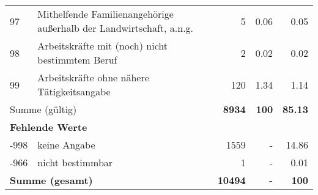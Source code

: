 \begin{longtable}{lXrrr}
        97 & \multicolumn{1}{X}{Mithelfende Familienangehörige außerhalb der Landwirtschaft, a.n.g.} & %
          \num{5} &
          \num[round-mode=places,round-precision=2]{0.06} &
          \num[round-mode=places,round-precision=2]{0.05} \\

        98 & \multicolumn{1}{X}{Arbeitskräfte mit (noch) nicht bestimmtem Beruf} & %
          \num{2} &
          \num[round-mode=places,round-precision=2]{0.02} &
          \num[round-mode=places,round-precision=2]{0.02} \\

        99 & \multicolumn{1}{X}{Arbeitskräfte ohne nähere Tätigkeitsangabe} & %
          \num{120} &
          \num[round-mode=places,round-precision=2]{1.34} &
          \num[round-mode=places,round-precision=2]{1.14} \\

     \midrule
     \multicolumn{2}{l}{Summe (gültig)} &
       \textbf{\num{8934}} &
     \textbf{\num{100}} &
       \textbf{\num[round-mode=places,round-precision=2]{85.13}} \\
     \multicolumn{5}{l}{\textbf{Fehlende Werte}}\\
       -998 &
       keine Angabe &
         \num{1559} &
        - &
         \num[round-mode=places,round-precision=2]{14.86} \\
       -966 &
       nicht bestimmbar &
         \num{1} &
        - &
         \num[round-mode=places,round-precision=2]{0.01} \\
     \midrule
     \multicolumn{2}{l}{\textbf{Summe (gesamt)}} &
          \textbf{\num{10494}} &
        \textbf{-} &
        \textbf{\num{100}} \\
     \bottomrule
     \end{longtable}
     
